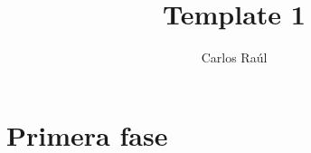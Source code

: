 \documentclass{article}
\title{Template 1}
\author{Carlos Raúl}
\theoremstyle{mytheoremstyle}
\theoremstyle{mytheoremstyle}
\theoremstyle{myproblemstyle}
\begin{document}
\maketitle
\section*{Primera fase}
\end{document}
